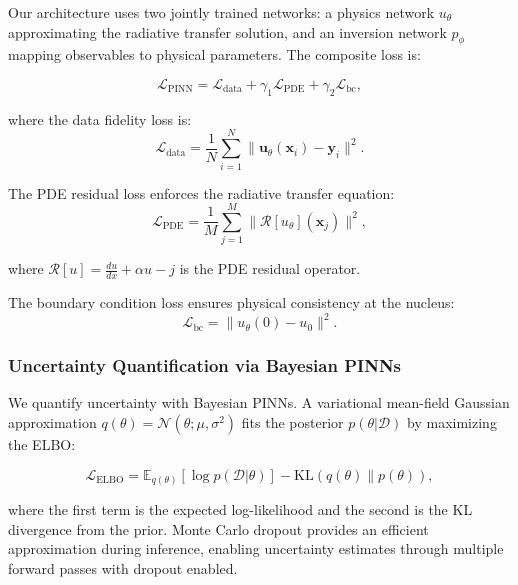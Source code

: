 \documentclass[preprint2]{aastex631}
\begin{document}
Our architecture uses two jointly trained networks: a physics network $u_\theta$ approximating the radiative transfer solution, and an inversion network $p_\phi$ mapping observables to physical parameters. The composite loss is:

\begin{equation}\label{eq:pinn_loss}
\mathcal{L}_{\text{PINN}} = \mathcal{L}_{\text{data}} + \gamma_1 \mathcal{L}_{\text{PDE}} + \gamma_2 \mathcal{L}_{\text{bc}},
\end{equation}

where the data fidelity loss is:
\begin{equation}\label{eq:data_loss}
\mathcal{L}_{\text{data}} = \frac{1}{N} \sum_{i=1}^{N} \|\mathbf{u}_\theta(\mathbf{x}_i) - \mathbf{y}_i\|^2.
\end{equation}

The PDE residual loss enforces the radiative transfer equation:
\begin{equation}\label{eq:pde_loss}
\mathcal{L}_{\text{PDE}} = \frac{1}{M} \sum_{j=1}^{M} \|\mathcal{R}[u_\theta](\mathbf{x}_j)\|^2,
\end{equation}

where $\mathcal{R}[u] = \frac{du}{dx} + \alpha u - j$ is the PDE residual operator.

The boundary condition loss ensures physical consistency at the nucleus:
\begin{equation}\label{eq:bc_loss}
\mathcal{L}_{\text{bc}} = \|u_\theta(0) - u_0\|^2.
\end{equation}

\subsubsection{Uncertainty Quantification via Bayesian PINNs}

We quantify uncertainty with Bayesian PINNs. A variational mean-field Gaussian approximation $q(\theta) = \mathcal{N}(\theta; \mu, \sigma^2)$ fits the posterior $p(\theta | \mathcal{D})$ by maximizing the ELBO:

\begin{equation}\label{eq:elbo}
\mathcal{L}_{\text{ELBO}} = \mathbb{E}_{q(\theta)}[\log p(\mathcal{D}|\theta)] - \text{KL}(q(\theta) \| p(\theta)),
\end{equation}

where the first term is the expected log-likelihood and the second is the KL divergence from the prior. Monte Carlo dropout \citep{gal16} provides an efficient approximation during inference, enabling uncertainty estimates through multiple forward passes with dropout enabled.
\end{document}
